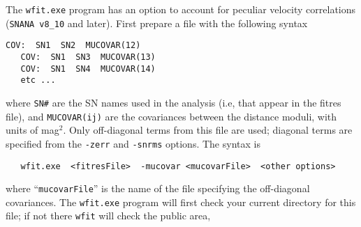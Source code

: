 \documentclass[12pt]{article}
\newcommand{\snana}{{\tt SNANA}}
\begin{document}
The {\tt wfit.exe} program has an option to account
for peculiar velocity correlations
(\snana\ {\tt v8\_10} and later).
First prepare a file with the following syntax
%
\begin{Verbatim}[frame=single]
   COV:  SN1  SN2  MUCOVAR(12)
   COV:  SN1  SN3  MUCOVAR(13)
   COV:  SN1  SN4  MUCOVAR(14)
   etc ...
\end{Verbatim}
%
where {\tt SN\#} are the SN names
used in the analysis (i.e, that appear in the fitres file),
and {\tt MUCOVAR(ij)} are the covariances between the
distance moduli, with units of mag$^2$.
Only off-diagonal terms from this file are used;
diagonal terms are specified from the 
{\tt -zerr} and {\tt -snrms} options.
The syntax is
\begin{verbatim}
   wfit.exe  <fitresFile>  -mucovar <mucovarFile>  <other options>
\end{verbatim}
%
where ``{\tt mucovarFile}'' is the name of the file
specifying the off-diagonal covariances.
The {\tt wfit.exe} program will first check
your current directory for this file; 
if not there {\tt wfit} will check the public area,
\end{document}
